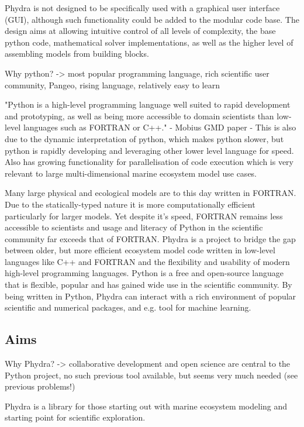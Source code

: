 \documentclass[journal abbreviation, manuscript]{copernicus}
\begin{document}
Phydra is not designed to be specifically used with a graphical user interface (GUI), although such functionality could be added to the modular code base.
The design aims at allowing intuitive control of all levels of complexity, the base python code, mathematical solver implementations, as well as the higher level of assembling models from building blocks.

Why python? -> most popular programming language, rich scientific user community, Pangeo, rising language, relatively easy to learn

"Python is a high-level programming language well suited to rapid development and prototyping, as well as being more accessible to domain scientists than low-level languages such as FORTRAN or C++." - Mobius GMD paper
- This is also due to the dynamic interpretation of python, which makes python slower, but python is rapidly developing and leveraging other lower level language for speed. Also has growing functionality for parallelisation of code execution which is very relevant to large multi-dimensional marine ecosystem model use cases. 

Many large physical and ecological models are to this day written in FORTRAN. Due to the statically-typed nature it is more computationally efficient particularly for larger models. Yet despite it's speed, FORTRAN remains less accessible to scientists and usage and literacy of Python in the scientific community far exceeds that of FORTRAN.
Phydra is a project to bridge the gap between older, but more efficient ecosystem model code written in low-level languages like C++ and FORTRAN and the flexibility and usability of modern high-level programming languages. Python is a free and open-source language that is flexible, popular and has gained wide use in the scientific community. By being written in Python, Phydra can interact with a rich environment of popular scientific and numerical packages, and e.g. tool for machine learning. 


\subsection{Aims}
Why Phydra? -> collaborative development and open science are central to the Python project, no such previous tool available, but seems very much needed (see previous problems!)

Phydra is a library for those starting out with marine ecosystem modeling and starting point for scientific exploration.
\end{document}
